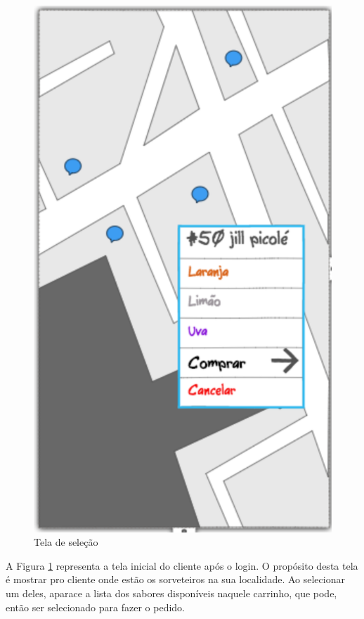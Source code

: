 \begin{figure}[!h]
	\centering
    \includegraphics[scale=0.7]{figuras/home_cliente}
    \caption{Tela de seleção}
    \label{fig:home_page}
\end{figure}

\newpage

A Figura \ref{fig:home_page} representa a tela inicial do cliente após o login. O propósito desta tela é mostrar pro cliente onde estão os sorveteiros na sua localidade. Ao selecionar um deles, aparace a lista dos sabores disponíveis naquele carrinho, que pode, então ser selecionado para fazer o pedido.

